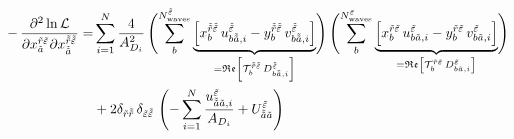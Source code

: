 \begin{align}
  \label{eq:likelihood_function_re_re_deriv}
  -\dmd{\ln \mathcal{L}}{2}{{x_{\tilde{a}}^{\tilde{r} \tilde{\refl}}}}{}{{x_{\doubletilde{a}}^{\doubletilde{r} \doubletilde{\refl}}}}{}
  = &\sum_{i = 1}^{N} \frac{4}{A_{D_i}^2}
  \rBrk[4]{\sum_b^{N^{\doubletilde{\refl}}_\text{waves}}
  \underbrace{\sBrk{x_b^{\doubletilde{r} \doubletilde{\refl}}\, u^{\doubletilde{\refl}}_{b \doubletilde{a}, i}
    - y_b^{\doubletilde{r} \doubletilde{\refl}}\, v^{\doubletilde{\refl}}_{b \doubletilde{a}, i}}}_{%
     = \Re\sBrk{\mathcal{T}_b^{\doubletilde{r} \doubletilde{\refl}}\, D^{\doubletilde{\refl}}_{b \doubletilde{a}, i}}}}
  \rBrk[4]{\sum_b^{N^{\tilde{\refl}}_\text{waves}}
  \underbrace{\sBrk{x_b^{\tilde{r} \tilde{\refl}}\, u^{\tilde{\refl}}_{b \tilde{a}, i}
    - y_b^{\tilde{r} \tilde{\refl}}\, v^{\tilde{\refl}}_{b \tilde{a}, i}}}_{%
    = \Re\sBrk{\mathcal{T}_b^{\tilde{r} \tilde{\refl}}\, D^{\tilde{\refl}}_{b \tilde{a}, i}}}} \\
  &+ 2 \delta_{\tilde{r} \doubletilde{r}}\, \delta_{\tilde{\refl} \doubletilde{\refl}}\,
  \rBrk[4]{-\sum_{i = 1}^{N} \frac{u^{\tilde{\refl}}_{\doubletilde{a} \tilde{a}, i}}{A_{D_i}} + U^{\tilde{\refl}}_{\doubletilde{a} \tilde{a}}}
\end{align}
